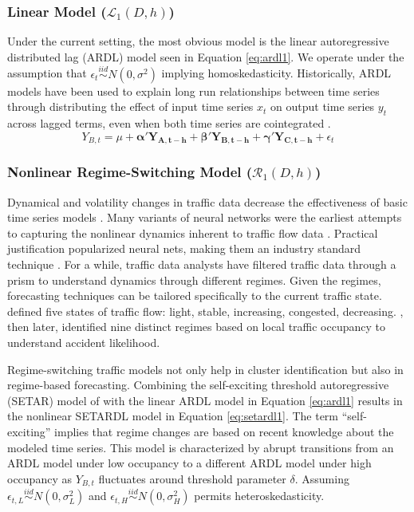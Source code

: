 \subsubsection{Linear Model ($\mathcal{L}_1(D,h)$)}
Under the current setting, the most obvious model is the linear autoregressive distributed lag (ARDL) model seen in Equation \ref{eq:ardl1}. We operate under the assumption that $\epsilon_t \overset{iid}\sim N(0,\sigma^2)$ implying homoskedasticity. Historically, ARDL models have been used to explain long run relationships between time series through distributing the effect of input time series $x_t$ on output time series $y_t$ across lagged terms, even when both time series are cointegrated  \citep{Pesaran1998,Hassler2006}.
\begin{equation}
\label{eq:ardl1}
Y_{B,t}=\mu+\bm{\alpha}'\bm{Y_{A,t-h}}+\bm{\beta}'\bm{Y_{B,t-h}}+\bm{\gamma}'\bm{Y_{C,t-h}}+\epsilon_t
\end{equation}

\subsubsection{Nonlinear Regime-Switching Model  ($\mathcal{R}_1(D,h)$)}
Dynamical \citep{Queen2009} and volatility changes \citep{Vlahogianni2011} in traffic data decrease the effectiveness of basic time series models \citep{Vlahogianni2004}. Many variants of neural networks were the earliest attempts to capturing the nonlinear dynamics inherent to traffic flow data \cite{Smith1997}. Practical justification popularized neural nets, making them an industry standard technique \citep{Ledoux1997}. For a while, traffic data analysts have filtered traffic data through a prism to understand dynamics through different regimes. Given the regimes, forecasting techniques can be tailored specifically to the current traffic state\citep{Danech1991,Voort1996}. \cite{Zhu2012} defined five states of traffic flow: light, stable, increasing, congested, decreasing. \cite{Xu2012}, then later\cite{Theofilatos2017},  identified nine distinct regimes based on local traffic occupancy to understand accident likelihood.
 
Regime-switching traffic models not only help in cluster identification\citep{Kamarianakis2010,Kamarianakis2012} but also in  regime-based forecasting\citep{Dunne2012}. Combining the self-exciting threshold autoregressive (SETAR) model of \cite{Ghaddar1981} with the linear ARDL model in Equation \ref{eq:ardl1} results in the nonlinear SETARDL model in Equation \ref{eq:setardl1}. The term ``self-exciting'' implies that regime changes are based on recent knowledge about the modeled time series. This model is characterized by abrupt transitions from an ARDL model under low occupancy to a different ARDL model under high occupancy as $Y_{B,t}$ fluctuates around threshold parameter $\delta$.  Assuming $\epsilon_{t,L} \overset{iid}\sim N(0,\sigma_L^2)$ and $\epsilon_{t,H} \overset{iid}\sim N(0,\sigma_H^2)$ permits heteroskedasticity.


